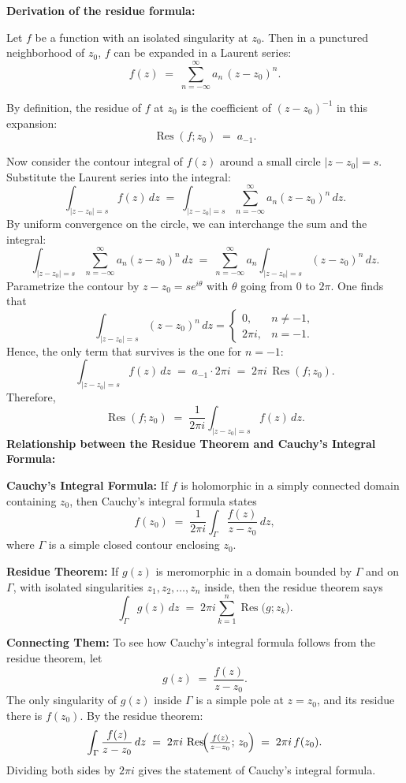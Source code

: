 \documentclass[12pt]{article}
\title{}
\author{Jerich Lee}
\date{\today}
\theoremstyle{definition} %
\theoremstyle{plain} %
\begin{document}
\maketitle
\textbf{Derivation of the residue formula:}

\bigskip

Let $f$ be a function with an isolated singularity at $z_0$. Then in a punctured neighborhood of $z_0$, $f$ can be expanded in a Laurent series:
\[
f(z) \;=\; \sum_{n=-\infty}^{\infty} a_{n} \,(z - z_0)^n.
\]

By definition, the residue of $f$ at $z_0$ is the coefficient of $(z - z_0)^{-1}$ in this expansion:
\[
\operatorname{Res}(f; z_0) \;=\; a_{-1}.
\]

Now consider the contour integral of $f(z)$ around a small circle $|z - z_0| = s$. Substitute the Laurent series into the integral:
\[
\int_{|z - z_0|=s} f(z)\, dz
\;=\;
\int_{|z - z_0|=s} \sum_{n=-\infty}^\infty a_n (z - z_0)^n \, dz.
\]
By uniform convergence on the circle, we can interchange the sum and the integral:
\[
\int_{|z - z_0|=s} \sum_{n=-\infty}^\infty a_n (z - z_0)^n \, dz
\;=\;
\sum_{n=-\infty}^\infty
a_n \int_{|z - z_0|=s} (z - z_0)^n \, dz.
\]
Parametrize the contour by $z - z_0 = s e^{i\theta}$ with $\theta$ going from $0$ to $2\pi$. One finds that
\[
\int_{|z - z_0|=s} (z - z_0)^n \, dz = 
\begin{cases}
0, & n \neq -1, \\
2\pi i, & n = -1.
\end{cases}
\]
Hence, the only term that survives is the one for $n = -1$:
\[
\int_{|z - z_0|=s} f(z)\, dz
\;=\;
a_{-1} \cdot 2\pi i
\;=\;
2\pi i \,\operatorname{Res}(f; z_0).
\]
Therefore,
\[
\operatorname{Res}(f; z_0)
\;=\;
\frac{1}{2\pi i}
\int_{|z - z_0| = s} f(z)\, dz.
\]
\textbf{Relationship between the Residue Theorem and Cauchy's Integral Formula:}

\medskip

\noindent
\textbf{Cauchy's Integral Formula:}  
If $f$ is holomorphic in a simply connected domain containing $z_0$, then Cauchy's integral formula states
\[
f(z_0)
\;=\;
\frac{1}{2\pi i}
\int_{\Gamma}
\frac{f(z)}{z - z_0}\, dz,
\]
where $\Gamma$ is a simple closed contour enclosing $z_0$.

\medskip

\noindent
\textbf{Residue Theorem:}  
If $g(z)$ is meromorphic in a domain bounded by $\Gamma$ and on $\Gamma$, with isolated singularities $z_1, z_2, \dots, z_n$ inside, then the residue theorem says
\[
\int_{\Gamma} g(z)\, dz
\;=\;
2\pi i
\sum_{k=1}^n
\operatorname{Res}\bigl(g; z_k\bigr).
\]

\medskip

\noindent
\textbf{Connecting Them:}  
To see how Cauchy's integral formula follows from the residue theorem, let
\[
g(z)
\;=\;
\frac{f(z)}{z - z_0}.
\]
The only singularity of $g(z)$ inside $\Gamma$ is a simple pole at $z = z_0$, and its residue there is $f(z_0)$. By the residue theorem:
\[
\int_{\Gamma}
\frac{f(z)}{z - z_0}
\,dz
\;=\;
2\pi i
\,\operatorname{Res}\!\Bigl(\tfrac{f(z)}{z - z_0};\, z_0\Bigr)
\;=\;
2\pi i
\,f(z_0).
\]
Dividing both sides by $2\pi i$ gives the statement of Cauchy's integral formula.
\end{document}
